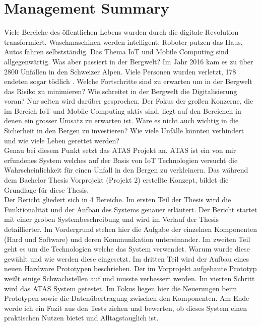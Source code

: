 \documentclass[11pt,english,german]{report}
\theoremstyle{definition}
\begin{document}
\tableofcontents







\chapter*{Management Summary}
Viele Bereiche des öffentlichen Lebens wurden durch die digitale Revolution transformiert. Waschmaschinen werden intelligent, Roboter putzen das Haus, Autos fahren selbstständig. Das Thema IoT und Mobile Computing sind allgegenwärtig. Was aber passiert in der Bergwelt? Im Jahr 2016 kam es zu über 2800 Unfällen in den Schweizer Alpen. Viele Personen wurden verletzt, 178 endeten sogar tödlich \cite{sacaccident}. Welche Fortschritte sind zu erwarten um in der Bergwelt das Risiko zu minimieren? Wie schreitet in der Bergwelt die Digitalisierung voran? Nur selten wird darüber gesprochen. Der Fokus der großen Konzerne, die im Bereich IoT und Mobile Computing aktiv sind, liegt auf den Bereichen in denen ein grosser Umsatz zu erwarten ist. Wäre es nicht auch wichtig in die Sicherheit in den Bergen zu investieren? Wie viele Unfälle könnten verhindert und wie viele Leben gerettet werden?\\[0.3cm]
Genau bei diesem Punkt setzt das \gls{ATAS} Projekt an. ATAS ist ein von mir erfundenes System welches auf der Basis von IoT Technologien versucht die Wahrscheinlichkeit für einen Unfall in den Bergen zu verkleinern. Das während dem Bachelor Thesis Vorprojekt (Projekt 2) erstellte Konzept, bildet die Grundlage für diese Thesis.\\[0.3cm] Der Bericht gliedert sich in 4 Bereiche. Im ersten Teil der Thesis wird die Funktionalität und der Aufbau des Systems genauer erläutert. Der Bericht startet mit einer groben Systembeschreibung und wird im Verlauf der Thesis detaillierter. Im Vordergrund stehen hier die Aufgabe der einzelnen Komponenten (Hard und Software) und deren Kommunikation untereinander. Im zweiten Teil geht es um die Technologien welche das System verwendet. Warum wurde diese gewählt und wie werden diese eingesetzt. Im dritten Teil wird der Aufbau eines neuen Hardware Prototypen beschrieben. Der im Vorprojekt aufgebaute Prototyp weißt einige Schwachstellen auf und musste verbessert werden. Im vierten Schritt wird das ATAS System getestet. Im Fokus liegen hier die Neuerungen beim Prototypen sowie die Datenübertragung zwischen den Komponenten. Am Ende werde ich ein Fazit aus den Tests ziehen und bewerten, ob dieses System einen praktischen Nutzen bietet und Alltagstauglich ist.
\end{document}
